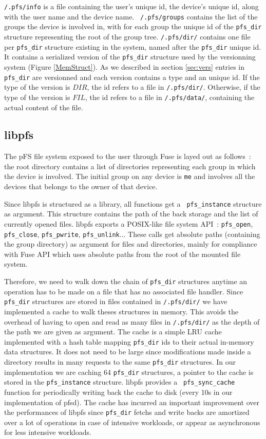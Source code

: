 {\tt /.pfs/info} is a file containing the user's unique id, the device's
unique id, along with the user name and the device name. {\tt
  /.pfs/groups} contains the list of the groups the device is involved
in, with for each group the unique id of the {\tt pfs\_dir} structure
representing the root of the group tree. {\tt /.pfs/dir/} contains one
file per {\tt pfs\_dir} structure existing in the system, named after
the {\tt pfs\_dir} unique id. It contains a serialized version of the
{\tt pfs\_dir} structure used by the versionning system (Figure
\ref{MemStruct}). As we described in section \ref{sec:vers}
entries in {\tt pfs\_dir} are versionned and each version contains a
type and an unique id. If the type of the version is $DIR$, the id
refers to a file in {\tt /.pfs/dir/}. Otherwise, if the type of the
version is $FIL$, the id refers to a file in {\tt /.pfs/data/},
containing the actual content of the file.

\subsection {libpfs}

The pFS file system exposed to the user through Fuse is layed out as
follows~: the root directory contains a list of directories
representing each group in which the device is involved. The initial
group on any device is {\tt me} and involves all the devices that
belongs to the owner of that device.

Since libpfs is structured as a library, all functions get a {\tt
  pfs\_instance} structure as argument. This structure contains the path
of the back storage and the list of currently opened files. libpfs
exports a POSIX-like file system API~: {\tt pfs\_open}, {\tt
  pfs\_close}, {\tt pfs\_pwrite}, {\tt pfs\_unlink}... These calls get
absolute paths (containing the group directory) as argument for files
and directories, mainly for compliance with Fuse API
which uses absolute paths from the root of the mounted file system.

Therefore, we need to walk down the chain of {\tt pfs\_dir} structures
anytime an operation has to be made on a file that has no associated
file handler. Since {\tt pfs\_dir} structures are stored in files
contained in {\tt /.pfs/dir/} we have implemented a cache to walk
theses structures in memory. This avoids the overhead of having to
open and read as many files in {\tt /.pfs/dir/} as the depth of the
path we are given as argument. The cache is a simple LRU cache
implemented with a hash table mapping {\tt pfs\_dir} ids to their
actual in-memory data structures. It does not need to be large since
modifications made inside a directory results in many requests to the
same {\tt pfs\_dir} structures. In our implementation we are caching
64 {\tt pfs\_dir} structures, a pointer to the cache is stored in the
{\tt pfs\_instance} structure. libpfs provides a {\tt
  pfs\_sync\_cache} function for periodically writing back the cache
to disk (every 10s in our implementation of pfsd). The cache has
incurred an important improvement over the performances of libpfs
since {\tt pfs\_dir} fetchs and write backs are amortized over a lot
of operations in case of intensive workloads, or appear as
asynchronous for less intensive workloads.

